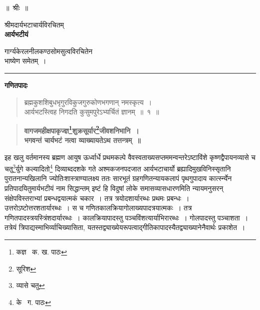 \documentclass[11pt, openany]{book}
\begin{document}
\newpage

\begin{center}
\large{॥~श्रीः~॥}

\vspace{0.3cm}
श्रीमदार्यभटाचार्यविरचितम्\\
\vspace{0.3cm}
{\Huge\textbf{आर्यभटीयं}}

\vspace{0.3cm}
गार्ग्यकेरलनीलकण्ठसोमसुत्वविरचितेन\\
भाष्येण समेतम्~।

\begin{center}
\rule{2cm}{.5mm} 
\end{center}

\vspace{0.3cm}\textbf{गणितपादः}
\end{center}

\begin{quote}
{\ab ब्रह्मकुशशिबुधभृगुरविकुजगुरुकोणभगणान् नमस्कृत्य~।\\
आर्यभटस्त्विह निगदति कुसुमपुरेऽभ्यर्चितं ज्ञानम्~॥~१~॥}
\end{quote}

\begin{quote}
\textbf{वागजमहीक्षपाकृज्ज्ञ\renewcommand{\thefootnote}{\s १}\footnote{\s कज्ञ \textendash\ क. ख. पाठः}शुक्रसूर्यार\renewcommand{\thefootnote}{\s २}\footnote{\s सूरिश}जीवशनिभानि~।\\
भगवन्तं चार्यभटं नत्वा व्याख्यायतेऽथ तत्तन्त्रम्~॥}
\end{quote}

इह खलु वर्तमानस्य ब्रह्मण आयुष ऊर्ध्वार्धे प्रथमकल्पे वैवस्वताख्यसप्तममन्वन्तरेऽष्टाविंशे कृष्णद्वैपायनव्यासे च चतु\renewcommand{\thefootnote}{३}\footnote{व्यासे चतु}र्युगे कल्यादितो\renewcommand{\thefootnote}{४}\footnote{के \textendash\ ग. पाठः}
दिव्याब्ददशके गते अश्मकजनपदजात आर्यभटाचार्यो ब्रह्यादिमुखविनिस्सृतानि पुरातनान्यखिलानि ज्योतिःशास्त्राण्यालक्ष्य ततः सारभूतं ग्रहगणितन्यायकलापं पृथगुपादाय कार्त्स्न्येन प्रतिपादयितुमार्यभटीयं नाम सिद्धान्तम् {\qt इष्टं हि विदुषां लोके समासव्यासधारणमि}ति न्यायमनुसरन् संक्षेपविस्तराभ्यां प्रबन्धद्वयात्मकं चकार~। तत्र त्रयोदशार्यारब्धः प्रथमः प्रबन्धः~। उत्तरोऽष्टोत्तरशतार्यारब्धः~। स च गणितकालक्रियागोलाख्यपादत्रयात्मकः~। तत्र गणितपादस्त्रयस्त्रिंशदार्यारब्धः~। कालक्रियापादस्तु पञ्चविंशत्यार्याभिरारब्धः~। गोलपादस्तु पञ्चाशता~। तत्रेयं त्रिपाद्यस्माभिर्व्याचिख्यासिता, यतस्तद्व्याख्येयरूपत्वाद्गीतिकापादस्यैतद्व्याख्यानेनैवार्थः प्रकाशेत~। 

\end{document}

